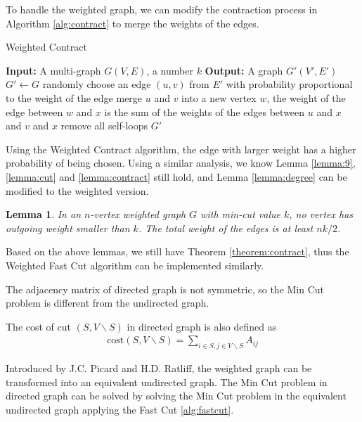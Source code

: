 \documentclass[11pt]{article}
\theoremstyle{plain}
\newtheorem{lemma}{Lemma}[section]
\begin{document}
To handle the weighted graph, we can modify the contraction process in Algorithm \ref{alg:contract} to merge the weights of the edges.
\begin{algorithm}
    \caption{Weighted Contract}
    \label{alg:weightcontract}
    \begin{algorithmic}[1]
        \STATE \textbf{Input:} A multi-graph $G(V,E)$, a number $k$
        \STATE \textbf{Output:} A graph $G'(V',E')$
        \STATE $G'\leftarrow G$
        \STATE randomly choose an edge $(u,v)$ from $E'$ with probability proportional to the weight of the edge
        \STATE merge $u$ and $v$ into a new vertex $w$, the weight of the edge between $w$ and $x$ is the sum of the weights of the edges between $u$ and $x$ and $v$ and $x$
        \STATE remove all self-loops
        \ENDWHILE
        \RETURN $G'$
    \end{algorithmic}
\end{algorithm}

Using the Weighted Contract algorithm, the edge with larger weight has a higher probability of being chosen. Using a similar analysis, we know Lemma \ref{lemma:9}, \ref{lemma:cut} and \ref{lemma:contract} still hold, and Lemma \ref{lemma:degree} can be modified to the weighted version.

\begin{lemma}
    In an $n$-vertex weighted graph $G$ with min-cut value $k$, no vertex has outgoing weight smaller than $k$. The total weight of the edges is at least $nk/2$.
\end{lemma}

Based on the above lemmas, we still have Theorem \ref{theorem:contract}, thus the Weighted Fast Cut algorithm can be implemented similarly.

The adjacency matrix of directed graph is not symmetric, so the Min Cut problem is different from the undirected graph.

The cost of cut $(S,V\backslash S)$ in directed graph is also defined as
\begin{align*}
    \text{cost}(S,V\backslash S)=\sum_{i\in S, j\in V\backslash S}A_{ij}
\end{align*}

Introduced by J.C. Picard and H.D. Ratliff\cite{picard1975minimum}, the weighted graph can be transformed into an equivalent undirected graph. The Min Cut problem in directed graph can be solved by solving the Min Cut problem in the equivalent undirected graph applying the Fast Cut \ref{alg:fastcut}.
\end{document}
